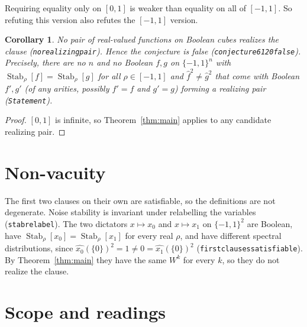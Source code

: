 \documentclass[11pt]{article}
\newtheorem{corollary}[theorem]{Corollary}
\theoremstyle{definition}
\theoremstyle{remark}
\renewcommand{\_}{\oldus\allowbreak}
\newcommand{\Stab}{\operatorname{Stab}}
\begin{document}
Requiring equality only on $[0,1]$ is weaker than equality on all of $[-1,1]$. So refuting this
version also refutes the $[-1,1]$ version.

\begin{corollary}\label{cor:false}
No pair of real-valued functions on Boolean cubes realizes the clause (\texttt{no\_realizing\_pair}).
Hence the conjecture is false (\texttt{conjecture6120\_false}). Precisely, there are no $n$ and no
Boolean $f,g$ on $\{-1,1\}^n$ with $\Stab_\rho[f]=\Stab_\rho[g]$ for all $\rho\in[-1,1]$ and
$\hat f^2\ne\hat g^2$ that come with Boolean $f',g'$ (of any arities, possibly $f'=f$ and $g'=g$)
forming a realizing pair (\texttt{Statement}).
\end{corollary}

\begin{proof}
$[0,1]$ is infinite, so Theorem~\ref{thm:main} applies to any candidate realizing pair.
\end{proof}

\section{Non-vacuity}\label{sec:nv}

The first two clauses on their own are satisfiable, so the definitions are not degenerate. Noise
stability is invariant under relabelling the variables (\texttt{stab\_relabel}). The two dictators
$x\mapsto x_0$ and $x\mapsto x_1$ on $\{-1,1\}^2$ are Boolean, have
$\Stab_\rho[x_0]=\Stab_\rho[x_1]$ for every real $\rho$, and have different spectral distributions,
since $\hat{x_0}(\{0\})^2=1\ne0=\hat{x_1}(\{0\})^2$ (\texttt{first\_clauses\_satisfiable}). By
Theorem~\ref{thm:main} they have the same $W^k$ for every $k$, so they do not realize the clause.

\section{Scope and readings}
\end{document}
